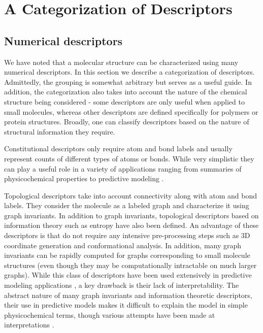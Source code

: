 \documentclass[letterpaper, 12pt]{article}
\begin{document}
\section{A Categorization of Descriptors}
\label{sec:categ-descr}

\subsection{Numerical descriptors}
\label{sec:numer-descr}


We have noted that a molecular structure can be characterized using
many numerical descriptors. In this section we describe a
categorization of descriptors. Admittedly, the grouping is somewhat
arbitrary but serves as a useful guide. In addition, the
categorization also takes into account the nature of the chemical
structure being considered - some descriptors are only useful when
applied to small molecules, whereas other descriptors are defined
specifically for polymers or protein structures.  Broadly, one can
classify descriptors based on the nature of structural information
they require.

Constitutional descriptors only require atom and bond labels and
usually represent counts of different types of atoms or bonds. While
very simplistic they can play a useful role in a variety of
applications ranging from summaries of physicochemical properties to
predictive modeling \cite{Bender:2005aa}.

Topological descriptors take into account connectivity along with atom
and bond labels. They consider the molecule as a labeled graph and
characterize it using graph invariants. In addition to graph
invariants, topological descriptors based on information theory such
as entropy have also been defined\cite{Dehmer:2009uq}. An advantage of
these descriptors is that do not require any intensive pre-processing
steps such as 3D coordinate generation and conformational analysis. In
addition, many graph invariants can be rapidly computed for graphs
corresponding to small molecule structures (even though they may be
computationally intractable on much larger graphs). While this class
of descriptors have been used extensively in predictive modeling
applications
\cite{Garcia-Domenech:2008aa,Randic:2001ad,Besalu:2001aa}, a key
drawback is their lack of interpretability. The abstract nature of
many graph invariants and information theoretic descriptors, their use
in predictive models makes it difficult to explain the model in simple
physicochemical terms, though various attempts have been made at
interpretations \cite{Todeschini:1975dq,Stanton:2003aa}.
\end{document}
